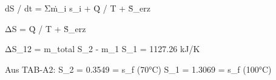 dS / dt = Σṁ_i s_i + Q̇ / T + Ṡ_erz  

ΔS = Q̇ / T + Ṡ_erz  

ΔS_12 = m_total S_2 - m_1 S_1  
= 1127.26 kJ/K  

Aus TAB-A2:  
S_2 = 0.3549 = s_f (70°C)  
S_1 = 1.3069 = s_f (100°C)